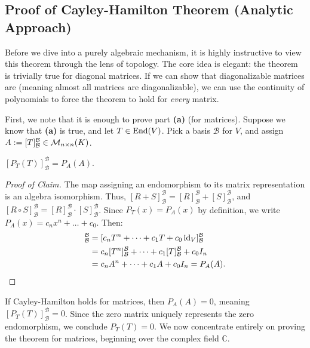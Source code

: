 \subsection*{Proof of Cayley-Hamilton Theorem (Analytic Approach)}

Before we dive into a purely algebraic mechanism, it is highly instructive to view this theorem through the lens of topology. The core idea is elegant: the theorem is trivially true for diagonal matrices. If we can show that diagonalizable matrices are  (meaning almost all matrices are diagonalizable), we can use the continuity of polynomials to force the theorem to hold for \textit{every} matrix.

First, we note that it is enough to prove part \textbf{(a)} (for matrices). Suppose we know that \textbf{(a)} is true, and let $T \in \operatorname{End}(V)$. Pick a basis $\mathcal{B}$ for $V$, and assign $A := [T]_{\mathcal{B}}^{\mathcal{B}} \in \mathcal{M}_{n \times n}(K)$.

\begin{claim*}\label{claim:matrix_poly}
  $[P_T(T)]_{\mathcal{B}}^{\mathcal{B}} = P_A(A)$.
\end{claim*}

\begin{proof}[Proof of Claim]
  The map assigning an endomorphism to its matrix representation is an algebra isomorphism. Thus, $[R+S]_{\mathcal{B}}^{\mathcal{B}} = [R]_{\mathcal{B}}^{\mathcal{B}} + [S]_{\mathcal{B}}^{\mathcal{B}}$, and $[R \circ S]_{\mathcal{B}}^{\mathcal{B}} = [R]_{\mathcal{B}}^{\mathcal{B}} \cdot [S]_{\mathcal{B}}^{\mathcal{B}}$.
  Since $P_T(x) = P_A(x)$ by definition, we write $P_A(x) = c_n x^n + \dots + c_0$. Then:
  \begin{align*}
    [P_T(T)]_{\mathcal{B}}^{\mathcal{B}} &= [c_n T^n + \dots + c_1 T + c_0 \id_V]_{\mathcal{B}}^{\mathcal{B}} \\
    &= c_n [T^n]_{\mathcal{B}}^{\mathcal{B}} + \dots + c_1 [T]_{\mathcal{B}}^{\mathcal{B}} + c_0 I_n \\
    &= c_n A^n + \dots + c_1 A + c_0 I_n = P_A(A).
  \end{align*}
\end{proof}

If Cayley-Hamilton holds for matrices, then $P_A(A) = 0$, meaning $[P_T(T)]_{\mathcal{B}}^{\mathcal{B}} = 0$. Since the zero matrix uniquely represents the zero endomorphism, we conclude $P_T(T) = 0$. We now concentrate entirely on proving the theorem for matrices, beginning over the complex field $\mathbb{C}$.

